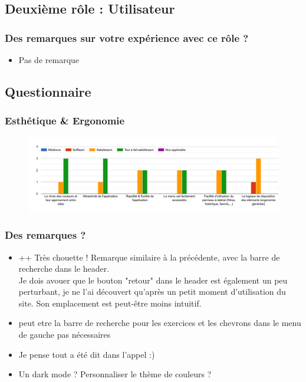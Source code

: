 \subsection{Deuxième rôle : Utilisateur}

\subsubsection*{Des remarques sur votre expérience avec ce rôle ?}

\begin{itemize}
    \item Pas de remarque
\end{itemize}

\subsection{Questionnaire}


\subsubsection*{Esthétique \& Ergonomie}

\begin{figure}[H]
    \includegraphics[width=\textwidth,height=0.3\textheight,keepaspectratio]{images/googleForm/ergonomie_1.png}
    \centering
\end{figure}


\subsubsection*{Des remarques ?}

\begin{itemize}
    \item ++ Très chouette ! Remarque similaire à la précédente, avec la barre de recherche dans le header.\\
    Je dois avouer que le bouton "retour" dans le header est également un peu perturbant, je ne l'ai découvert qu'après un petit moment d'utilisation du site. Son emplacement est peut-être moins intuitif.
    \item peut etre la barre de recherche pour les exercices et les chevrons dans le menu de gauche pas nécessaires
    \item Je pense tout a été dit dans l'appel :)
    \item Un dark mode ? Personnaliser le thème de couleurs ?
\end{itemize}


